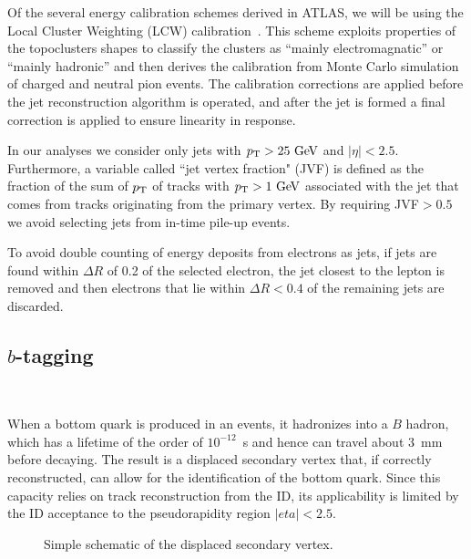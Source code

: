 Of the several energy calibration schemes derived in ATLAS, we will be using the 
Local Cluster Weighting (LCW) calibration~\cite{LCW1,LCW2}.
This scheme exploits properties of the topoclusters shapes 
to classify the clusters as ``mainly electromagnatic'' or
``mainly hadronic'' and then derives the calibration from Monte Carlo simulation
of charged and neutral pion events. The calibration corrections are applied
before the jet reconstruction algorithm is operated, and after the jet is
formed a final correction is applied to ensure linearity in response.


In our analyses we consider only jets with $\pt > 25\gev$ and $|\eta| < 2.5$.
Furthermore, a variable called ``jet vertex fraction" (JVF) is defined as the fraction
of the sum of $\pt$ of tracks with $\pt>1\gev$
associated with the jet that comes from tracks originating from the primary vertex.
By requiring JVF$>0.5$ we avoid selecting jets from in-time pile-up events.

To avoid double counting of energy deposits from electrons as jets,
if jets are found within $\Delta R$ of 0.2 of the selected electron, the
jet closest to the lepton is removed and then electrons that lie within $\Delta R< 0.4$ of
the remaining jets are discarded.


\subsection{$b$-tagging}~\label{sec:btagging}

When a bottom quark is produced in an events, it hadronizes into a $B$ hadron, which has
a lifetime of the order of $10^{-12}$~s and hence can travel about 3~mm before decaying.
The result is a displaced secondary vertex that, if correctly reconstructed, can
allow for the identification of the bottom quark. 
Since this capacity relies on track reconstruction from the ID, its applicability
is limited by the ID acceptance to the pseudorapidity region $|eta|<2.5$.

\begin{figure}[tb]\begin{center}
	\caption{Simple schematic of the displaced secondary vertex.\label{fig:btagvtx}}
\end{center}\end{figure}

